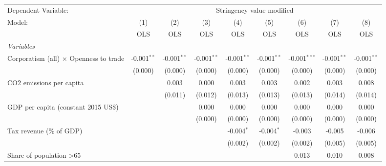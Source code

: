 
\begingroup
\centering
\begin{tabular}{lcccccccc}
   \toprule
   Dependent Variable: & \multicolumn{8}{c}{Stringency value modified}\\
   Model:                                        & (1)           & (2)           & (3)           & (4)           & (5)           & (6)            & (7)           & (8)\\  
                                                 &  OLS          & OLS           & OLS           & OLS           & OLS           & OLS            & OLS           & OLS\\  
   \midrule
   \emph{Variables}\\
   Corporatism (all) $\times$ Openness to trade  & -0.001$^{**}$ & -0.001$^{**}$ & -0.001$^{**}$ & -0.001$^{**}$ & -0.001$^{**}$ & -0.001$^{***}$ & -0.001$^{**}$ & -0.001$^{**}$\\   
                                                 & (0.000)       & (0.000)       & (0.000)       & (0.000)       & (0.000)       & (0.000)        & (0.000)       & (0.000)\\   
   CO2 emissions per capita                      &               & 0.003         & 0.000         & 0.003         & 0.003         & 0.002          & 0.003         & 0.008\\   
                                                 &               & (0.011)       & (0.012)       & (0.013)       & (0.013)       & (0.013)        & (0.014)       & (0.014)\\   
   GDP per capita (constant 2015 US\$)           &               &               & 0.000         & 0.000         & 0.000         & 0.000          & 0.000         & 0.000\\   
                                                 &               &               & (0.000)       & (0.000)       & (0.000)       & (0.000)        & (0.000)       & (0.000)\\   
   Tax revenue (\% of GDP)                       &               &               &               & -0.004$^{*}$  & -0.004$^{*}$  & -0.003         & -0.005        & -0.006\\   
                                                 &               &               &               & (0.002)       & (0.002)       & (0.002)        & (0.005)       & (0.005)\\   
   Share of population >65                       &               &               &               &               &               & 0.013          & 0.010         & 0.008\\   

\end{tabular}
